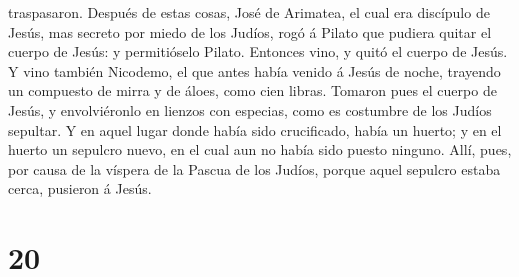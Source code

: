 traspasaron.  Después de estas cosas, José de Arimatea,
el cual era discípulo de Jesús, mas secreto por miedo de los Judíos,
rogó á Pilato que pudiera quitar el cuerpo de Jesús: y permitióselo
Pilato. Entonces vino, y quitó el cuerpo de Jesús.  Y
vino también Nicodemo, el que antes había venido á Jesús de noche,
trayendo un compuesto de mirra y de áloes, como cien libras.
 Tomaron pues el cuerpo de Jesús, y envolviéronlo en
lienzos con especias, como es costumbre de los Judíos sepultar.
 Y en aquel lugar donde había sido crucificado, había un
huerto; y en el huerto un sepulcro nuevo, en el cual aun no había sido
puesto ninguno.  Allí, pues, por causa de la víspera de
la Pascua de los Judíos, porque aquel sepulcro estaba cerca, pusieron á
Jesús.

\hypertarget{section-19}{%
\section{20}\label{section-19}}

